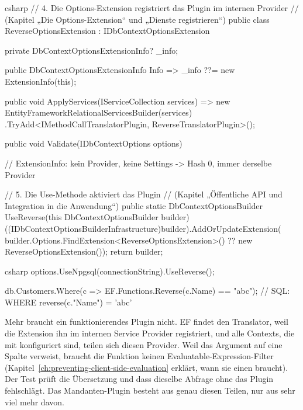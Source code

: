 \begin{sourcecode}{csharp}
// 4. Die Options-Extension registriert das Plugin im internen Provider
//    (Kapitel „Die Options-Extension“ und „Dienste registrieren“)
public class ReverseOptionsExtension : IDbContextOptionsExtension
{
    private DbContextOptionsExtensionInfo? _info;

    public DbContextOptionsExtensionInfo Info => _info ??= new ExtensionInfo(this);

    public void ApplyServices(IServiceCollection services)
        => new EntityFrameworkRelationalServicesBuilder(services)
            .TryAdd<IMethodCallTranslatorPlugin, ReverseTranslatorPlugin>();

    public void Validate(IDbContextOptions options)
    {
    }

    // ExtensionInfo: kein Provider, keine Settings -> Hash 0, immer derselbe Provider
}

// 5. Die Use-Methode aktiviert das Plugin
//    (Kapitel „Öffentliche API und Integration in die Anwendung“)
public static DbContextOptionsBuilder UseReverse(this DbContextOptionsBuilder builder)
{
    ((IDbContextOptionsBuilderInfrastructure)builder).AddOrUpdateExtension(
        builder.Options.FindExtension<ReverseOptionsExtension>()
        ?? new ReverseOptionsExtension());
    return builder;
}
\end{sourcecode}

\begin{sourcecode}[Anwendung]{csharp}
options.UseNpgsql(connectionString).UseReverse();

db.Customers.Where(c => EF.Functions.Reverse(c.Name) == "abc");
// SQL: WHERE reverse(c."Name") = 'abc'
\end{sourcecode}

Mehr braucht ein funktionierendes Plugin nicht. EF findet den Translator, weil die Extension
ihn im internen Service Provider registriert, und alle Contexts, die mit
 konfiguriert sind, teilen sich diesen
Provider. Weil das Argument auf eine Spalte verweist, braucht die Funktion keinen
Evaluatable-Expression-Filter (Kapitel~\ref{ch:preventing-client-side-evaluation} erklärt,
wann sie einen braucht). Der Test  prüft
die Übersetzung und dass dieselbe Abfrage ohne das Plugin fehlschlägt. Das Mandanten-Plugin
besteht aus genau diesen Teilen, nur aus sehr viel mehr davon.


